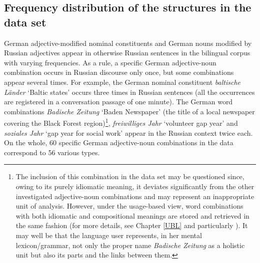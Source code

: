 \subsection{Frequency distribution of the structures in the data set}\label{sec:frequency-distribution}
German adjective-modified nominal constituents and German nouns modified by Russian adjectives appear in otherwise Russian sentences in the bilingual corpus with varying frequencies. As a rule, a specific German adjective-noun combination occurs in Russian discourse only once, but some combinations appear several times. For example, the German nominal constituent \textit{baltische Länder} `Baltic states' occurs three times in Russian sentences (all the occurrences are registered in a conversation passage of one minute). The German word combinations \textit{Badische Zeitung} `Baden Newspaper' (the title of a local newspaper covering the Black Forest region)\footnote{The inclusion of this  combination in the data set may be questioned since, owing to its purely idiomatic meaning, it deviates significantly from the other investigated adjective-noun combinations and may represent an inappropriate unit of analysis. However, under the usage-based view, word combinations with both idiomatic and compositional meanings are stored and retrieved in the same fashion (for more details, see Chapter \ref{UBL} and particularly ). It may well be that the language user represents, in her mental lexicon/grammar, not only the proper name \textit{Badische Zeitung} as a holistic unit but also its parts and the links between them.}, \textit{freiwilliges Jahr} `volunteer gap year' and \textit{soziales Jahr} `gap year for social work' appear in the Russian context twice each. On the whole, 60 specific German adjective-noun combinations in the data correspond to 56 various types. 


